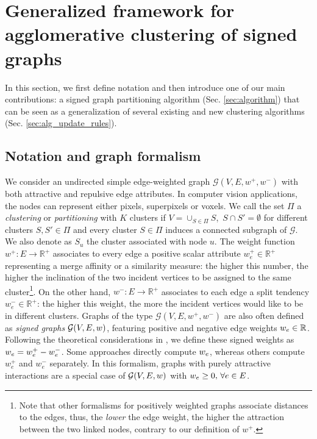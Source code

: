 
\section{Generalized framework for agglomerative clustering of signed graphs} \label{sec:general_framework}
In this section, we first define notation and then introduce one of our main contributions: a signed graph partitioning algorithm (Sec. \ref{sec:algorithm}) that can be seen as a generalization of several existing and new clustering algorithms (Sec. \ref{sec:alg_update_rules}).

\subsection{Notation and graph formalism} \label{sec:notation}

We consider an undirected simple edge-weighted graph $\mathcal{G}(V,E,w^+, w^-)$ with both attractive and repulsive edge attributes. In computer vision applications, the nodes can represent either pixels, superpixels or voxels. We call the set $\Pi$ a \emph{clustering} or \emph{partitioning} with $K$ clusters if $V = \cup_{S\in\Pi} S $, $\,S \cap S' = \emptyset$ for different clusters $S, S'\in \Pi$ and every cluster $S \in \Pi$ induces a connected subgraph of $\mathcal{G}$. We also denote as $S_u$ the cluster associated with node $u$.
The weight function $w^+: E \rightarrow \mathbb{R}^+$ associates to every edge a positive scalar attribute $w_e^+\in \mathbb{R}^+$ representing a merge affinity or a similarity measure: the higher this number, the higher the inclination of the two incident vertices to be assigned to the same cluster\footnote{Note that other formalisms for positively weighted graphs associate distances to the edges, thus, the \emph{lower} the edge weight, the higher the attraction between the two linked nodes, contrary to our definition of $w^+$.}. On the other hand, $w^-: E \rightarrow \mathbb{R}^+$ associates to each edge a split tendency $w_e^- \in \mathbb{R}^+$: the higher this weight, the more the incident vertices would like to be in different clusters. 
Graphs of the type $\mathcal{G}(V,E,w^+, w^-)$ are also often defined as \emph{signed graphs} $\mathcal{G}(V,E,w)$, featuring positive and negative edge weights $w_e\in \mathbb{R}$. Following the theoretical considerations in \cite{lange2018partial}, we define these signed weights as ${w_e = w_e^+ - w_e^-}$. Some approaches directly compute $w_e$, whereas others compute $w_e^+$ and $w_e^-$ separately.
In this formalism, graphs with purely attractive interactions are a special case of $\mathcal{G}(V,E,w)$ with $w_e \geq 0, \, \forall e \in E$. 

